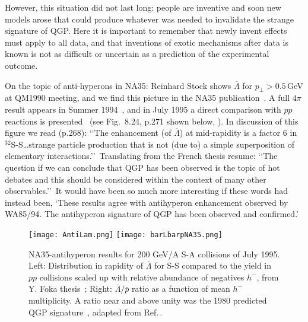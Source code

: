 \documentclass{appolb}
\begin{document}
However, this situation did not last long: people are inventive and soon new models arose that could produce whatever was needed to invalidate the strange signature of QGP. Here it is important to remember that newly invent effects must apply to all data, and that inventions of exotic mechanisms after data is known is not as difficult or uncertain as a prediction of the experimental outcome.

On the topic of anti-hyperons in NA35: Reinhard Stock shows $\overline{\Lambda}$ for $p_\bot>0.5$\,GeV at QM1990  meeting, and we find this picture in the NA35 publication~\cite{Bachler:1992js}. A full $4\pi$ result appears in Summer 1994~\cite{Alber:1994tz}, and in July 1995 a direct comparison with $pp$ reactions is presented~\cite{Foka:1995Thesis} (see Fig.~8.24, p.271 shown below, ). In discussion of this figure we read (p.268): \lq\lq The enhancement (of $\overline{\Lambda}$) at mid-rapidity is a factor 6 in $^{32}$S-S\ldots strange particle production that is not (due to) a simple superposition of elementary interactions.\rq\rq\ Translating from the French thesis resume: \lq\lq The question if we can conclude that QGP has been observed is the topic of hot debates and this should be considered within the context of many other observables.\rq\rq\ It would have been so much more interesting if these words had instead been, \lq These results agree with antihyperon enhancement observed by WA85/94. The antihyperon signature of QGP has been observed and confirmed.\rq

\begin{figure}[bht]
\centerline{%
\texttt{[image: AntiLam.png]} 
\texttt{[image: barLbarpNA35.png]}}
\caption{NA35-antihyperon results for 200 GeV/A S-A collisions of July 1995. Left: Distribution in rapidity of $\bar\Lambda$ for S-S compared to the yield in $pp$ collisions scaled up with relative abundance of negatives $h^-$, from Y. Foka thesis~\cite{Foka:1995Thesis}; Right: $\bar\Lambda/\bar p$ ratio as a function of mean $h^-$ multiplicity. A ratio near and above unity was the 1980 predicted QGP signature~\cite{Rafelski:1980fy}, adapted from Ref.\,\cite{Alber:1996mq}.}
\label{AntiHypFig}
\end{figure}
\end{document}
